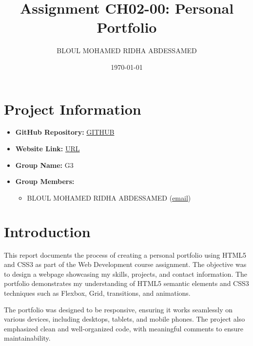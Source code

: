 \documentclass[12pt]{article}
\title{\color{titlecolor}Assignment CH02-00: Personal Portfolio}
\author{\color{titlecolor}BLOUL MOHAMED RIDHA ABDESSAMED}
\date{\color{titlecolor}\today}
\begin{document}
\maketitle

\renewcommand{\contentsname}{\color{sectioncolor}Table of Contents}
\tableofcontents
\newpage

\section*{\color{sectioncolor}Project Information}
\begin{itemize}
    \item \textbf{GitHub Repository:} \href{https://github.com/Bloul-Mohamed/Assignment-CH02-00.git}{\color{linkcolor}GITHUB}
    \item \textbf{Website Link:} \href{https://yourwebsite.com}{\color{linkcolor}URL}
    \item \textbf{Group Name:} G3
    \item \textbf{Group Members:} 
        \begin{itemize}
            \item BLOUL MOHAMED RIDHA ABDESSAMED (\href{mailto:m.bloul.inf@lagh-univ.dz}{\color{linkcolor}email})
        \end{itemize}
\end{itemize}

\section{\color{sectioncolor}Introduction}
\label{sec:introduction}
This report documents the process of creating a personal portfolio using HTML5 and CSS3 as part of the Web Development course assignment. The objective was to design a webpage showcasing my skills, projects, and contact information. The portfolio demonstrates my understanding of HTML5 semantic elements and CSS3 techniques such as Flexbox, Grid, transitions, and animations.

The portfolio was designed to be responsive, ensuring it works seamlessly on various devices, including desktops, tablets, and mobile phones. The project also emphasized clean and well-organized code, with meaningful comments to ensure maintainability.
\end{document}
